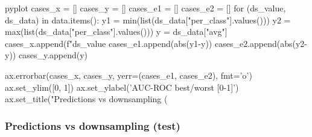 \begin{frame}[fragile]
\begin{CacheMeCode}{pyplot}
    cases_x = []
    cases_y = []
    cases_e1 = []
    cases_e2 = []
    for (ds_value, ds_data) in data.items():
        y1 = min(list(ds_data["per_class"].values()))
        y2 = max(list(ds_data["per_class"].values()))
        y = ds_data["avg"]
        cases_x.append(f"{ds_value}%
        cases_e1.append(abs(y1-y))
        cases_e2.append(abs(y2-y))
        cases_y.append(y)

    ax.errorbar(cases_x, cases_y, yerr=(cases_e1, cases_e2), fmt='o')
    ax.set_ylim([0, 1])
    ax.set_ylabel('AUC-ROC best/worst [0-1]')
    ax.set_title("Predictions vs downsampling (%
  \end{CacheMeCode}
\end{frame}

\begin{frame}[fragile]
  \frametitle{Predictions vs downsampling (test)}


\end{frame}
